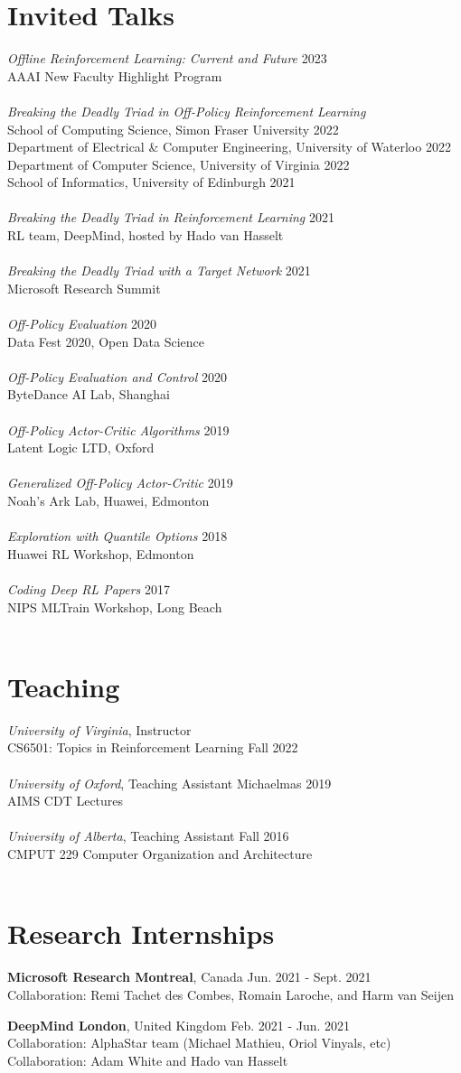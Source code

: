 \documentclass[margin, 10pt]{res} %
\newcommand*{\talk}[3]{{{\sl #2} \hfill #1 \\ #3 \\ \\}}
\newcommand*{\teaching}[4]{{{\sl #3}, #2 \hfill #1 \\ #4\\ \\}}
\begin{document}
\begin{resume}
\section{Invited Talks}
\talk{2023}{Offline Reinforcement Learning: Current and Future}{AAAI New Faculty Highlight Program}
\talk{}{Breaking the Deadly Triad in Off-Policy Reinforcement Learning}{
School of Computing Science, Simon Fraser University \hfill 2022\\
Department of Electrical \& Computer Engineering, University of Waterloo \hfill 2022 \\
Department of Computer Science, University of Virginia \hfill 2022 \\
School of Informatics, University of Edinburgh \hfill 2021}
\talk{2021}{Breaking the Deadly Triad in Reinforcement Learning}{RL team, DeepMind, hosted by Hado van Hasselt}
\talk{2021}{Breaking the Deadly Triad with a Target Network}{Microsoft Research Summit}
\talk{2020}{Off-Policy Evaluation}{Data Fest 2020, Open Data Science}
\talk{2020}{Off-Policy Evaluation and Control}{ByteDance AI Lab, Shanghai}
\talk{2019}{Off-Policy Actor-Critic Algorithms}{Latent Logic LTD, Oxford}
\talk{2019}{Generalized Off-Policy Actor-Critic}{Noah's Ark Lab, Huawei, Edmonton}
\talk{2018}{Exploration with Quantile Options}{Huawei RL Workshop, Edmonton}
\talk{2017}{Coding Deep RL Papers}{NIPS MLTrain Workshop, Long Beach}

\section{Teaching}
\teaching{}{Instructor}{University of Virginia}{CS6501: Topics in Reinforcement Learning \hfill Fall 2022}
\teaching{Michaelmas 2019}{Teaching Assistant}{University of Oxford}{AIMS CDT Lectures}
\teaching{Fall 2016}{Teaching Assistant}{University of Alberta}{CMPUT 229 Computer Organization and Architecture}

\section{Research Internships}

{\textbf{Microsoft Research Montreal}, Canada} \hfill Jun. 2021 - Sept. 2021 \\
Collaboration: Remi Tachet des Combes, Romain Laroche, and Harm van Seijen  

{\textbf{DeepMind London}, United Kingdom} \hfill Feb. 2021 - Jun. 2021 \\
Collaboration: AlphaStar team (Michael Mathieu, Oriol Vinyals, etc) \\
Collaboration: Adam White and Hado van Hasselt


\end{resume}
\end{document}
